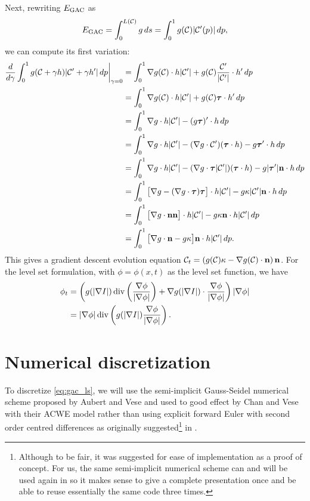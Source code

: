 Next, rewriting $E_\textrm{GAC}$ as 
\begin{align*}
E_\textrm{GAC} = \int^{L(\mathcal{C})}_0 g \, ds 
= \int^1_0 g(\mathcal{C}) \lvert\mathcal{C}'(p)\rvert \, dp ,
\end{align*} 
we can compute its first variation: 
\begin{align*}
\frac{d}{d\gamma} \int^1_0 g(\mathcal{C} + \gamma h) \lvert\mathcal{C}' + \gamma h'\rvert \, dp \bigg\rvert_{\gamma = 0}
&=  \int^1_0 \nabla g(\mathcal{C}) \cdot h \lvert\mathcal{C}'\rvert + g(\mathcal{C}) \frac{\mathcal{C}'}{\lvert\mathcal{C}'\rvert} \cdot h' \,dp 
\\
&=\int^1_0 \nabla g(\mathcal{C}) \cdot h \lvert\mathcal{C}'\rvert + g(\mathcal{C}) \boldsymbol{\tau} \cdot h' \,dp 
\\
&=\int^1_0 \nabla g \cdot h \lvert\mathcal{C}'\rvert - ( g \boldsymbol{\tau})' \cdot h \, dp
\\
&=\int^1_0 \nabla g \cdot h \lvert\mathcal{C}'\rvert - (\nabla g \cdot \mathcal{C}')(\boldsymbol{\tau} \cdot h) - g\boldsymbol{\tau} ' \cdot h \, dp
\\
&=\int^1_0 \nabla g \cdot h \lvert\mathcal{C}'\rvert - (\nabla g \cdot \boldsymbol{\tau} \lvert\mathcal{C}'\rvert )(\boldsymbol{\tau} \cdot h) - g\lvert\boldsymbol{\tau}'\rvert \mathbf{n} \cdot h \, dp
\\
&=\int^1_0 \big[ \nabla g  - (\nabla g \cdot \boldsymbol{\tau} )\boldsymbol{\tau} \big] \cdot h \lvert\mathcal{C}'\rvert - g\kappa \lvert\mathcal{C}'\rvert \mathbf{n} \cdot h \, dp
\\
&=\int^1_0 \big[\nabla g \cdot \mathbf{n} \mathbf{n} \big] \cdot h \lvert\mathcal{C}'\rvert - g\kappa  \mathbf{n} \cdot h \lvert\mathcal{C}'\rvert \, dp
\\
&=\int^1_0 \big[ \nabla g \cdot \mathbf{n} - g\kappa \big] \mathbf{n}  \cdot h \lvert\mathcal{C}'\rvert \, dp.
\\ 
\end{align*}
This gives a gradient descent evolution equation $\mathcal{C}_t = \left( g(\mathcal{C}) \kappa - \nabla g(\mathcal{C}) \cdot \mathbf{n} \right) \mathbf{n} $.
For the level set formulation, with $\phi = \phi(x, t)$ as the level set function, we have 
\begin{align}
\begin{split} 
\phi_t 
&= \left(
g( \lvert\nabla I \rvert ) \operatorname{div}\left( \frac{\nabla \phi}{\lvert\nabla \phi\rvert} \right)
	+  \nabla g(  \lvert\nabla I \rvert )\cdot  \frac{\nabla \phi}{\lvert\nabla \phi\rvert}
\right) \lvert \nabla \phi \rvert
\\
&= \lvert\nabla \phi\rvert \operatorname{div}\left( 
g(  \lvert\nabla I \rvert ) \frac{\nabla \phi}{\lvert\nabla \phi\rvert}
\right) .
\end{split}
\label{eq:gac_ls}
\end{align}

\section{Numerical discretization}
\label{sec:gac_num_disc}
To discretize \eqref{eq:gac_ls}, we will use the semi-implicit Gauss-Seidel  numerical scheme proposed by Aubert and Vese \cite{aubert1997variational} and used to good effect by Chan and Vese with their ACWE model \cite{chan2001active} rather than using explicit forward Euler with second order centred differences as originally suggested\footnote{Although to be fair, it was suggested for ease of implementation as a proof of concept. For us, the same semi-implicit numerical scheme can and will be used again in  so it makes sense to give a complete presentation once and be able to reuse essentially the same code three times. } in \cite{caselles1997geodesic}.

